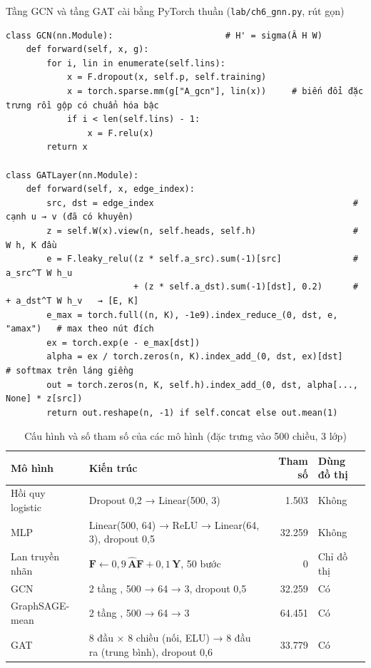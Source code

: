 \begin{code}{Tầng GCN và tầng GAT cài bằng PyTorch thuần (\texttt{lab/ch6\_gnn.py}, rút gọn)}
\label{lst:ch6-gat}
\begin{verbatim}
class GCN(nn.Module):                      # H' = sigma(Â H W)
    def forward(self, x, g):
        for i, lin in enumerate(self.lins):
            x = F.dropout(x, self.p, self.training)
            x = torch.sparse.mm(g["A_gcn"], lin(x))     # biến đổi đặc trưng rồi gộp có chuẩn hóa bậc
            if i < len(self.lins) - 1:
                x = F.relu(x)
        return x

class GATLayer(nn.Module):
    def forward(self, x, edge_index):
        src, dst = edge_index                                       # cạnh u → v (đã có khuyên)
        z = self.W(x).view(n, self.heads, self.h)                   # W h, K đầu
        e = F.leaky_relu((z * self.a_src).sum(-1)[src]              # a_src^T W h_u
                         + (z * self.a_dst).sum(-1)[dst], 0.2)      # + a_dst^T W h_v   → [E, K]
        e_max = torch.full((n, K), -1e9).index_reduce_(0, dst, e, "amax")   # max theo nút đích
        ex = torch.exp(e - e_max[dst])
        alpha = ex / torch.zeros(n, K).index_add_(0, dst, ex)[dst]          # softmax trên láng giềng
        out = torch.zeros(n, K, self.h).index_add_(0, dst, alpha[..., None] * z[src])
        return out.reshape(n, -1) if self.concat else out.mean(1)
\end{verbatim}
\end{code}

\begin{table}[H]
\centering
\caption{Cấu hình và số tham số của các mô hình (đặc trưng vào 500 chiều, 3 lớp)}
\label{tab:gnn-config}
\small
\begin{tabularx}{\linewidth}{@{}L{2.5cm}YrL{2.4cm}@{}}
\toprule
\textbf{Mô hình} & \textbf{Kiến trúc} & \textbf{Tham số} & \textbf{Dùng đồ thị} \\
\midrule
Hồi quy logistic & Dropout 0,2 → Linear(500, 3) & 1.503 & Không \\
MLP & Linear(500, 64) → ReLU → Linear(64, 3), dropout 0,5 & 32.259 & Không \\
Lan truyền nhãn & $\mathbf F\leftarrow0{,}9\,\hat{\mathbf A}\mathbf F+0{,}1\,\mathbf Y$, 50 bước & 0 & Chỉ đồ thị \\
GCN & 2 tầng , 500 → 64 → 3, dropout 0,5 & 32.259 & Có \\
GraphSAGE-mean & 2 tầng , 500 → 64 → 3 & 64.451 & Có \\
GAT & 8 đầu × 8 chiều (nối, ELU) → 8 đầu ra (trung bình), dropout 0,6 & 33.779 & Có \\
\bottomrule
\end{tabularx}
\end{table}

